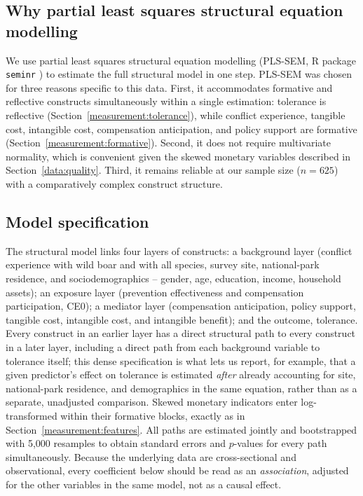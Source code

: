 \subsection{Why partial least squares structural equation modelling}
\label{model:why-plssem}

We use partial least squares structural equation modelling (PLS-SEM,
R package \texttt{seminr} \citep{Rseminr}) to estimate the full structural model in one
step. PLS-SEM was chosen for three reasons specific to this data. First, it
accommodates formative and reflective constructs simultaneously within a
single estimation: tolerance is reflective (Section~\ref{measurement:tolerance}),
while conflict experience, tangible cost, intangible cost, compensation
anticipation, and policy support are formative
(Section~\ref{measurement:formative}). Second, it does not require
multivariate normality, which is convenient given the skewed monetary
variables described in Section~\ref{data:quality}. Third, it remains reliable
at our sample size ($n = 625$) with a comparatively complex construct
structure.

\subsection{Model specification}
\label{model:spec}

The structural model links four layers of constructs: a background layer
(conflict experience with wild boar and with all species, survey site,
national-park residence, and sociodemographics -- gender, age, education,
income, household assets); an exposure layer (prevention effectiveness and
compensation participation, CE0); a mediator layer (compensation
anticipation, policy support, tangible cost, intangible cost, and intangible
benefit); and the outcome, tolerance. Every construct in an earlier layer has
a direct structural path to every construct in a later layer, including a
direct path from each background variable to tolerance itself; this dense
specification is what lets us report, for example, that a given
predictor's effect on tolerance is estimated \emph{after} already accounting
for site, national-park residence, and demographics in the same equation,
rather than as a separate, unadjusted comparison. Skewed monetary indicators
enter log-transformed within their formative blocks, exactly as in
Section~\ref{measurement:features}. All paths are estimated jointly and
bootstrapped with 5{,}000 resamples to obtain standard errors and $p$-values
for every path simultaneously. Because the underlying data are
cross-sectional and observational, every coefficient below should be read as
an \emph{association}, adjusted for the other variables in the same model,
not as a causal effect.


